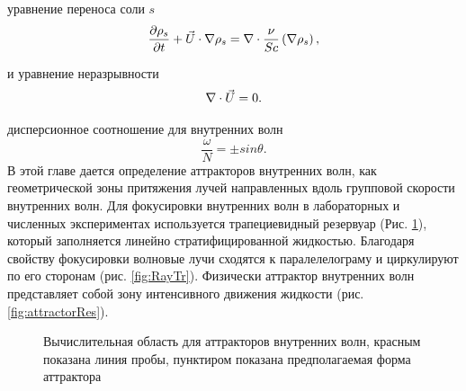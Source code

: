 \documentclass[utf8x]{G7-32} %
\begin{document}
\noindent уравнение переноса соли $s$
\begin{equation*}
 \large \frac{\partial \rho_s}{\partial t} + \vec U \cdot \nabla \rho_s  = \nabla \cdot \frac{\nu}{Sc} \left ( \nabla \rho_s \right ),
 \label{eq:transClassic}
\end{equation*}

\noindent и уравнение неразрывности
\begin{equation*}
 \large \nabla \cdot \vec U  = 0.
 \label{eq:contClassic}
\end{equation*}

\noindent дисперсионное соотношение для внутренних волн 
\begin{equation}
    \frac{\omega}{N} = \pm sin \theta.
    \label{eq:dispersion}
\end{equation}
В этой главе дается определение аттракторов внутренних волн, как геометрической зоны притяжения лучей направленных вдоль групповой скорости внутренних волн. Для фокусировки внутренних волн в лабораторных и численных экспериментах используется трапециевидный резервуар (Рис. \ref{fig:dominleft}), который заполняется линейно стратифицированной жидкостью.  Благодаря свойству фокусировки волновые лучи сходятся к паралелелограму и циркулируют по его сторонам (рис. \ref{fig:RayTr}). Физически аттрактор внутренних волн представляет собой зону интенсивного движения жидкости (рис. \ref{fig:attractorRes}).

\begin{figure}[!ht]
        \centering
          \caption{Вычислительная область для аттракторов внутренних волн, красным показана линия пробы, пунктиром показана предполагаемая форма аттрактора}
          \label{fig:dominleft}
\end{figure}
\end{document}
